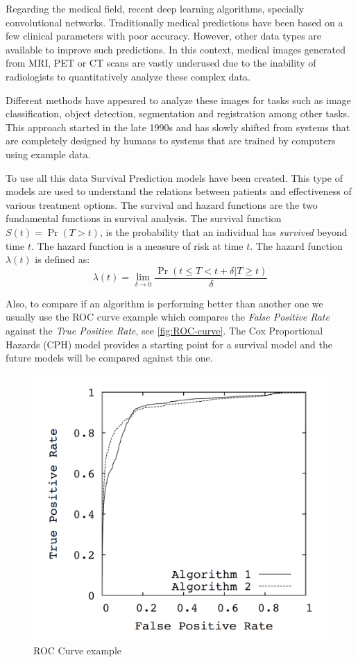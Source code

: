 \documentclass[a4paper]{article}
\begin{document}
Regarding the medical field, recent deep learning algorithms, specially convolutional networks. 
Traditionally medical predictions have been based on a few clinical parameters with poor accuracy.
However, other data types are available to improve such predictions. In this context, medical
images generated from MRI, PET or CT scans are vastly underused due to the inability of radiologists
to quantitatively analyze these complex data. 

Different methods have appeared to analyze these images for tasks such as
image classification, object detection, segmentation and registration among other tasks. This
approach started in the late 1990s and has slowly shifted from systems that are completely designed
by humans to systems that are trained by computers using example data. 
~\cite{survey-deep-learning}

To use all this data Survival Prediction models have been created. This type of models are
used to understand the relations between patients and effectiveness of various treatment options. 
The survival and hazard functions are the two fundamental functions in survival analysis. The
survival function \( S(t) = \Pr(T > t) \), is the probability that an individual has
\emph{survived} beyond time \( t \). The hazard function is a measure of risk at time \( t \).
The hazard function \( \lambda(t) \) is defined as:
~\cite{DeepSurv}
\[
    \lambda(t) = \lim_{\delta \rightarrow 0}
    \frac{\Pr(t \le T < t + \delta | T \ge t)}{\delta}
\]


Also, to compare if an algorithm is performing better than another one we usually use the ROC curve
example which compares the \emph{False Positive Rate} against the \emph{True Positive Rate},
see \autoref{fig:ROC-curve}. The Cox Proportional Hazards (CPH) model provides a starting point for a 
survival model and the future models will be compared against this one.
~\cites{ROC-precision-recall}{Cox}

\begin{figure}
    \centering
    \includegraphics[width=.5\linewidth]{images/roc_curve}
    \caption{ROC Curve example\label{fig:ROC-curve}}
\end{figure}
\end{document}
